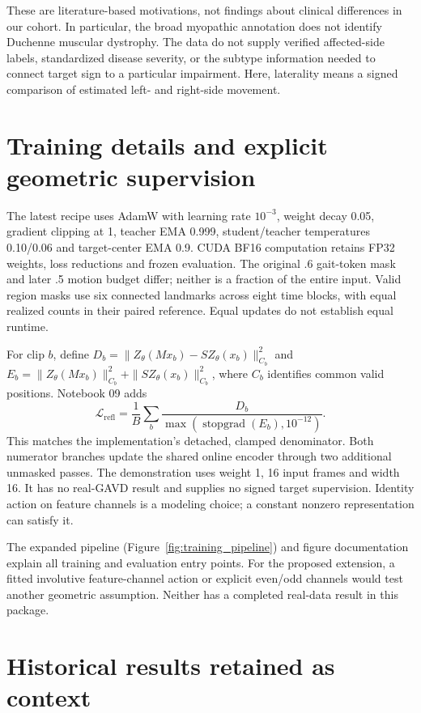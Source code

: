 \documentclass{article}
\begin{document}
These are literature-based motivations, not findings about clinical differences in our cohort. In particular, the broad myopathic annotation does not identify Duchenne muscular dystrophy. The data do not supply verified affected-side labels, standardized disease severity, or the subtype information needed to connect target sign to a particular impairment. Here, laterality means a signed comparison of estimated left- and right-side movement.

\section{Training details and explicit geometric supervision}\label{appendix-f.-training-details-and-explicit-geometric-supervision}

The latest recipe uses AdamW with learning rate \(10^{-3}\), weight decay 0.05, gradient clipping at 1, teacher EMA 0.999, student/teacher temperatures 0.10/0.06 and target-center EMA 0.9. CUDA BF16 computation retains FP32 weights, loss reductions and frozen evaluation. The original .6 gait-token mask and later .5 motion budget differ; neither is a fraction of the entire input. Valid region masks use six connected landmarks across eight time blocks, with equal realized counts in their paired reference. Equal updates do not establish equal runtime.

For clip \(b\), define \(D_b=\|Z_\theta(Mx_b)-S Z_\theta(x_b)\|_{C_b}^2\) and \(E_b=\|Z_\theta(Mx_b)\|_{C_b}^2+\|S Z_\theta(x_b)\|_{C_b}^2\), where \(C_b\) identifies common valid positions. Notebook 09 adds \[
\mathcal L_{\mathrm{refl}}=\frac1B\sum_b
\frac{D_b}{\max(\operatorname{stopgrad}(E_b),10^{-12})}.
\] This matches the implementation's detached, clamped denominator. Both numerator branches update the shared online encoder through two additional unmasked passes. The demonstration uses weight 1, 16 input frames and width 16. It has no real-GAVD result and supplies no signed target supervision. Identity action on feature channels is a modeling choice; a constant nonzero representation can satisfy it.

The expanded pipeline (Figure~\ref{fig:training_pipeline}) and {figure documentation} explain all training and evaluation entry points. For the proposed extension, a fitted involutive feature-channel action or explicit even/odd channels would test another geometric assumption. Neither has a completed real-data result in this package.

\section{Historical results retained as context}\label{appendix-g.-historical-results-retained-as-context}
\end{document}
